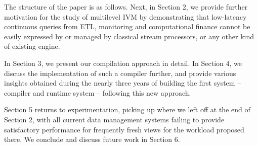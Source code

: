 

\medskip

The structure of the paper is as follows. Next, in Section 2, we provide further motivation for the study of multilevel IVM by demonstrating that low-latency continuous queries from ETL, monitoring and computational finance cannot be easily expressed by or managed by classical stream processors, or any other kind of existing engine. 

In Section 3, we present our compilation approach in detail. In Section 4, we discuss the implementation of such a compiler further, and provide various insights obtained during the nearly three years of building the first system -- compiler and runtime system -- following this new approach.

Section 5 returns to experimentation, picking up where we left off at the end of Section 2, with all current data management systems failing to provide satisfactory performance for frequently fresh views for the workload proposed there.
We conclude and discuss future work in Section 6.

